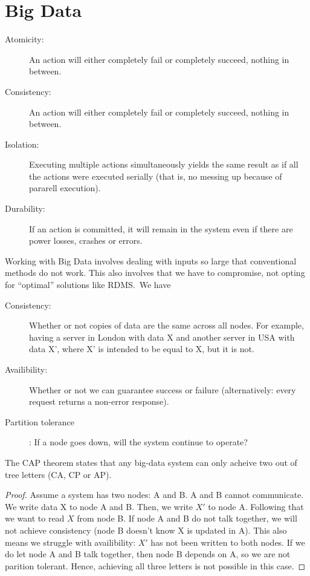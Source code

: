 \section{Big Data}
\begin{definition}[ACID]\label{def:acid}
    \begin{description}
        \item[Atomicity:] An action will either completely fail or completely succeed, nothing  in between.
        \item[Consistency:] An action will either completely fail or completely succeed, nothing  in between.
        \item[Isolation:] Executing multiple actions simultaneously yields the same result as if all the actions
            were executed serially (that is, no messing up because of pararell execution).
        \item[Durability:] If an action is committed, it will remain in the system even if there are
            power losses, crashes or errors.
    \end{description}
\end{definition}

\begin{definition}\label{def:captheorem}
    Working with Big Data involves dealing with inputs so large that conventional methods do not work.
    This also involves that we have to compromise, not opting for ``optimal'' solutions like RDMS.\
    We have 
    \begin{description}
        \item[Consistency:] Whether or not copies of data are the same across all nodes.
        For example, having a server in London with data X and another server in USA with data X', where X' is intended to be equal to X, but it is not.
        \item[Availibility:] Whether or not we can guarantee success or failure (alternatively: every request returns a non-error response).
        \item[Partition tolerance]:  If a node goes down, will the system continue to operate?
    \end{description}

    The CAP theorem states that any big-data system can only acheive two out of tree letters (CA, CP or AP).
\end{definition}

\begin{proof}
Assume a system has two nodes: A and B. A and B cannot communicate.
We write data X to node A and B. Then, we write $X'$ to node A. Following that we want to read $X$ from node B.
If node A and B do not talk together, we will not achieve consistency (node B doesn't know X is updated in A).
This also means we struggle with availibility: $X'$ has not been written to both nodes.
If we do let node A and B talk together, then node B depends on A, so we are not parition tolerant.
Hence, achieving all three letters is not possible in this case.
\end{proof}

